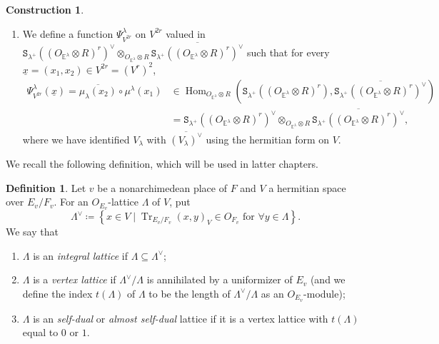 \documentclass[12pt]{amsart}
\numberwithin{equation}{section}
\theoremstyle{plain}
\theoremstyle{definition}
\newtheorem{definition}[proposition]{Definition}
\newtheorem{construction}[proposition]{Construction}
\theoremstyle{remark}
\renewcommand{\d}[1]{\mathbb{#1}}
\renewcommand{\(}{\left(}
\renewcommand{\)}{\right)}
\newcommand{\res}{\mathbin{|}}
\newcommand{\ol}[1]{\overline{#1}{}}
\newcommand{\ul}{\underline}
\newcommand{\dE}{\d E}
\newcommand{\tS}{\mathtt{S}}
\DeclareMathOperator{\Hom}{Hom}
\DeclareMathOperator{\Tr}{Tr}
\begin{document}
\begin{construction}
\begin{enumerate}
  \item We define a function $\Psi_{V^{2r}}^\lambda$ on $V^{2r}$ valued in $\tS_{\lambda^+}((O_{\dE^\lambda}\otimes R)^r)^\vee\otimes_{O_{\dE^\lambda}\otimes R}
      \ol{\tS_{\lambda^+}((O_{\dE^\lambda}\otimes R)^r)^\vee}$ such that for every $\ul{x}=(x_1,x_2)\in V^{2r}=(V^r)^2$,
      \begin{align*}
      \Psi_{V^{2r}}^\lambda(\ul{x})
      =\ol{\mu_\lambda(x_2)}\circ\mu^\lambda(x_1)
      &\in\Hom_{O_{\dE^\lambda}\otimes R}
      \(\tS_{\lambda^+}((O_{\dE^\lambda}\otimes R)^r),\ol{\tS_{\lambda^+}((O_{\dE^\lambda}\otimes R)^r)^\vee}\) \\
      &=\tS_{\lambda^+}((O_{\dE^\lambda}\otimes R)^r)^\vee\otimes_{O_{\dE^\lambda}\otimes R}
      \ol{\tS_{\lambda^+}((O_{\dE^\lambda}\otimes R)^r)^\vee},
      \end{align*}
      where we have identified $V_\lambda$ with $\ol{(V_\lambda)^\vee}$ using the hermitian form on $V$.
\end{enumerate}
\end{construction}













We recall the following definition, which will be used in latter chapters.

\begin{definition}\label{de:lattice}
Let $v$ be a nonarchimedean place of $F$ and $V$ a hermitian space over $E_v/F_v$. For an $O_{E_v}$-lattice $\Lambda$ of $V$, put
\[
\Lambda^\vee\coloneqq\left\{ x\in V\res \Tr_{E_v/F_v}(x,y)_V\in O_{F_v}\text{ for }\forall y\in\Lambda\right\}.
\]
We say that
\begin{enumerate}
  \item $\Lambda$ is an \emph{integral lattice} if $\Lambda\subseteq\Lambda^\vee$;

  \item $\Lambda$ is a \emph{vertex lattice} if $\Lambda^\vee/\Lambda$ is annihilated by a uniformizer of $E_v$ (and we define the index $t(\Lambda)$ of $\Lambda$ to be the length of $\Lambda^\vee/\Lambda$ as an $O_{E_v}$-module);

  \item $\Lambda$ is an \emph{self-dual} or \emph{almost self-dual} lattice if it is a vertex lattice with $t(\Lambda)$ equal to $0$ or $1$.
\end{enumerate}
\end{definition}
\end{document}
